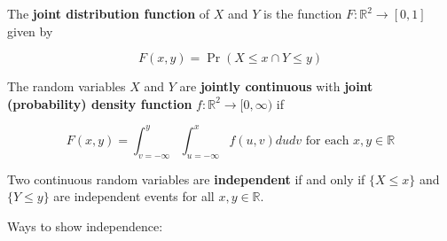\begin{definition} The \textbf{joint distribution function} of \(X\) and \(Y\) is the function \(F: \mathbb{R}^2 \to [0, 1]\) given by

\[
F(x, y) = \Pr(X \leq x \cap Y \leq y)
\]

\end{definition}

\begin{definition}

The random variables \(X\) and \(Y\) are \textbf{jointly continuous} with \textbf{joint (probability) density function} \(f: \mathbb{R}^2 \to [0, \infty)\) if

\[
F(x, y) = \int_{v=-\infty}^y \int_{u=-\infty}^x f(u, v) du dv \text{ for each } x, y \in \mathbb{R}
\]

\end{definition}

\begin{definition} \label{prob.cont.indep} Two continuous random variables are \textbf{independent} if and only if \(\{X \leq x\}\) and \(\{Y \leq y\}\) are independent events for all \(x, y \in \mathbb{R}\). \end{definition}

Ways to show independence:

